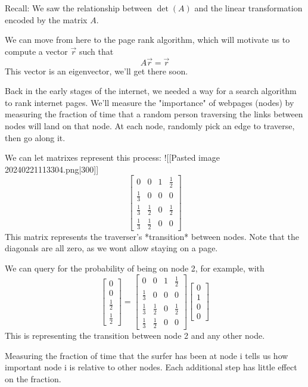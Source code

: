 Recall: We saw the relationship between $\det(A)$ and the linear transformation encoded by the matrix $A$.

We can move from here to the page rank algorithm, which will motivate us to compute a vector $\vec{r}$ such that 
$$
A\vec{r}=\vec{r}
$$
This vector is an eigenvector, we'll get there soon. 

Back in the early stages of the internet, we needed a way for a search algorithm to rank internet pages. We'll measure the "importance" of webpages (nodes) by measuring the fraction of time that a random person traversing the links between nodes will land on that node. At each node, randomly pick an edge to traverse, then go along it. 

We can let matrixes represent this process:
![[Pasted image 20240221113304.png|300]]
$$
\begin{bmatrix}
0 & 0 & 1 & \frac{1}{2} \\
\frac{1}{3} & 0 & 0 & 0 \\
\frac{1}{3} & \frac{1}{2} & 0 & \frac{1}{2} \\
\frac{1}{3} &  \frac{1}{2} & 0 & 0
\end{bmatrix}
$$
This matrix represents the traverser's *transition* between nodes. 
Note that the diagonals are all zero, as we wont allow staying on a page. 

We can query for the probability of being on node 2, for example, with 
$$
\begin{bmatrix}
0\\0\\ \frac{1}{2} \\ \frac{1}{2}
\end{bmatrix}
=
\begin{bmatrix}
0 & 0 & 1 & \frac{1}{2} \\
\frac{1}{3} & 0 & 0 & 0 \\
\frac{1}{3} & \frac{1}{2} & 0 & \frac{1}{2} \\
\frac{1}{3} &  \frac{1}{2} & 0 & 0
\end{bmatrix}\begin{bmatrix}
0\\1\\0\\0
\end{bmatrix}
$$
This is representing the transition between node 2 and any other node.

Measuring the fraction of time that the surfer has been at node i tells us how important node i is relative to other nodes. Each additional step has little effect on the fraction.


